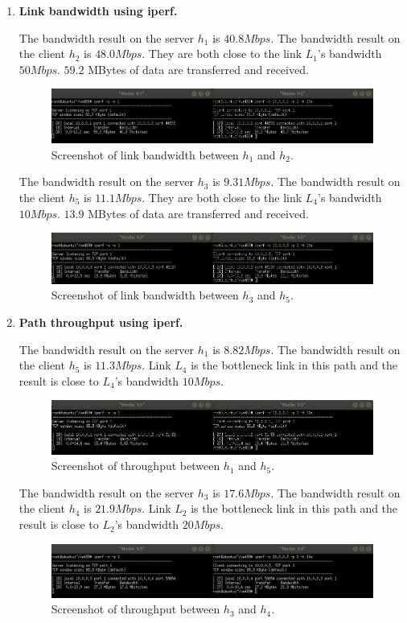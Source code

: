 \documentclass[a4paper]{article}
\begin{document}
\begin{enumerate}
\item
\textbf{Link bandwidth using iperf.}
\par
The bandwidth result on the server $h_1$ is $40.8Mbps$. The bandwidth result on the client $h_2$ is $48.0Mbps$. They are both close to the link $L_1$'s bandwidth $50Mbps$. $59.2$ MBytes of data are transferred and received.
\begin{figure}[htbp]
\centering
\includegraphics[scale=1]{5.jpg}
\caption{Screenshot of link bandwidth between $h_1$ and $h_2$.}
\end{figure}
\par
The bandwidth result on the server $h_3$ is $9.31Mbps$. The bandwidth result on the client $h_5$ is $11.1Mbps$. They are both close to the link $L_4$'s bandwidth $10Mbps$. $13.9$ MBytes of data are transferred and received.
\begin{figure}[htbp]
\centering
\includegraphics[scale=1]{6.jpg}
\caption{Screenshot of link bandwidth between $h_3$ and $h_5$.}
\end{figure}

\item
\textbf{Path throughput using iperf.}
\par
The bandwidth result on the server $h_1$ is $8.82Mbps$. The bandwidth result on the client $h_5$ is $11.3Mbps$. Link $L_4$ is the bottleneck link in this path and the result is close to $L_4$'s bandwidth $10Mbps$.
\begin{figure}[htbp]
\centering
\includegraphics[scale=1]{7.jpg}
\caption{Screenshot of throughput between $h_1$ and $h_5$.}
\end{figure}
\par
The bandwidth result on the server $h_3$ is $17.6Mbps$. The bandwidth result on the client $h_4$ is $21.9Mbps$. Link $L_2$ is the bottleneck link in this path and the result is close to $L_2$'s bandwidth $20Mbps$.
\begin{figure}[htbp]
\centering
\includegraphics[scale=1]{8.jpg}
\caption{Screenshot of throughput between $h_3$ and $h_4$.}
\end{figure}


\end{enumerate}
\end{document}
